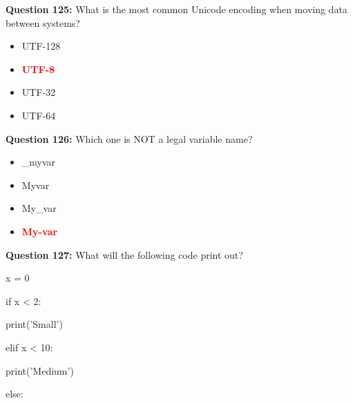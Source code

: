 \documentclass[12pt,a4paper]{article}
\begin{document}
\vspace{0.5cm}

\textbf{Question 125:} What is the most common Unicode encoding when moving data between systems?

\begin{itemize}
    \item[\textbf{A.}] UTF-128
    \item[\textbf{B.}] \textcolor{red}{\textbf{UTF-8}}
    \item[\textbf{C.}] UTF-32
    \item[\textbf{D.}] UTF-64
\end{itemize}

\vspace{0.5cm}

\textbf{Question 126:} Which one is NOT a legal variable name?

\begin{itemize}
    \item[\textbf{A.}] _myvar
    \item[\textbf{B.}] Myvar
    \item[\textbf{C.}] My_var
    \item[\textbf{D.}] \textcolor{red}{\textbf{My-var}}
\end{itemize}

\vspace{0.5cm}

\textbf{Question 127:} What will the following code print out?\newline

\newline
\newline

\newline
x = 0\newline

\newline
if x < 2:\newline

\newline
    print('Small')\newline

\newline
elif x < 10:\newline

\newline
    print('Medium')\newline

\newline
else:\newline
\end{document}

